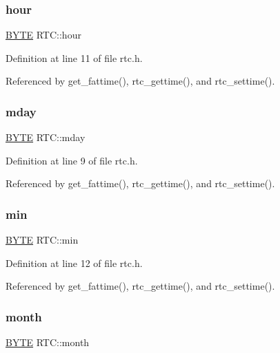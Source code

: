 \subsubsection{\texorpdfstring{hour}{hour}}
{\footnotesize\ttfamily \hyperlink{lz4_8c_a4ae1dab0fb4b072a66584546209e7d58}{B\+Y\+TE} R\+T\+C\+::hour}



Definition at line 11 of file rtc.\+h.



Referenced by get\+\_\+fattime(), rtc\+\_\+gettime(), and rtc\+\_\+settime().

\mbox{\label{structRTC_acc4fbd65d30d36768b338a734a1f90a7}} 
\subsubsection{\texorpdfstring{mday}{mday}}
{\footnotesize\ttfamily \hyperlink{lz4_8c_a4ae1dab0fb4b072a66584546209e7d58}{B\+Y\+TE} R\+T\+C\+::mday}



Definition at line 9 of file rtc.\+h.



Referenced by get\+\_\+fattime(), rtc\+\_\+gettime(), and rtc\+\_\+settime().

\mbox{\label{structRTC_a6a57a49351a0cdb606bb74d2930496ec}} 
\subsubsection{\texorpdfstring{min}{min}}
{\footnotesize\ttfamily \hyperlink{lz4_8c_a4ae1dab0fb4b072a66584546209e7d58}{B\+Y\+TE} R\+T\+C\+::min}



Definition at line 12 of file rtc.\+h.



Referenced by get\+\_\+fattime(), rtc\+\_\+gettime(), and rtc\+\_\+settime().

\mbox{\label{structRTC_ac2bd3ef00f0fa3600b729702d3a4df96}} 
\subsubsection{\texorpdfstring{month}{month}}
{\footnotesize\ttfamily \hyperlink{lz4_8c_a4ae1dab0fb4b072a66584546209e7d58}{B\+Y\+TE} R\+T\+C\+::month}



